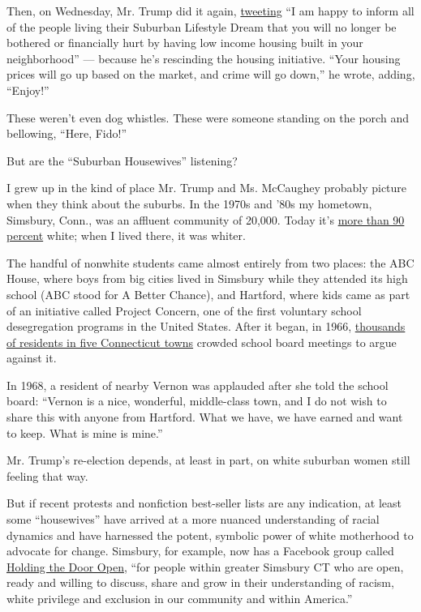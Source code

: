 Then, on Wednesday, Mr. Trump did it again,
\href{https://twitter.com/realDonaldTrump/status/1288509568578777088}{tweeting}
``I am happy to inform all of the people living their Suburban Lifestyle
Dream that you will no longer be bothered or financially hurt by having
low income housing built in your neighborhood'' --- because he's
rescinding the housing initiative. ``Your housing prices will go up
based on the market, and crime will go down,'' he wrote, adding,
``Enjoy!''

These weren't even dog whistles. These were someone standing on the
porch and bellowing, ``Here, Fido!''

But are the ``Suburban Housewives'' listening?

I grew up in the kind of place Mr. Trump and Ms. McCaughey probably
picture when they think about the suburbs. In the 1970s and '80s my
hometown, Simsbury, Conn., was an affluent community of 20,000. Today
it's
\href{https://www.census.gov/quickfacts/simsburytownhartfordcountyconnecticut}{more
than 90 percent} white; when I lived there, it was whiter.

The handful of nonwhite students came almost entirely from two places:
the ABC House, where boys from big cities lived in Simsbury while they
attended its high school (ABC stood for A Better Chance), and Hartford,
where kids came as part of an initiative called Project Concern, one of
the first voluntary school desegregation programs in the United States.
After it began, in 1966,
\href{https://www.courant.com/courant-250/moments-in-history/hc-xpm-2014-06-29-hc-250-project-concern-20140625-story.html\#:~:text=Glastonbury's\%20school\%20board\%20rejected\%20Project\%20Concern.\&text=One\%20Vernon\%20resident\%2C\%20who\%20spoke,this\%20with\%20anyone\%20from\%20Hartford.}{thousands
of residents in five Connecticut towns} crowded school board meetings to
argue against it.

In 1968, a resident of nearby Vernon was applauded after she told the
school board: ``Vernon is a nice, wonderful, middle-class town, and I do
not wish to share this with anyone from Hartford. What we have, we have
earned and want to keep. What is mine is mine.''

Mr. Trump's re-election depends, at least in part, on white suburban
women still feeling that way.

But if recent protests and nonfiction best-seller lists are any
indication, at least some ``housewives'' have arrived at a more nuanced
understanding of racial dynamics and have harnessed the potent, symbolic
power of white motherhood to advocate for change. Simsbury, for example,
now has a Facebook group called
\href{https://www.facebook.com/groups/holdingthedooropen/?ref=share}{Holding
the Door Open}, ``for people within greater Simsbury CT who are open,
ready and willing to discuss, share and grow in their understanding of
racism, white privilege and exclusion in our community and within
America.''

